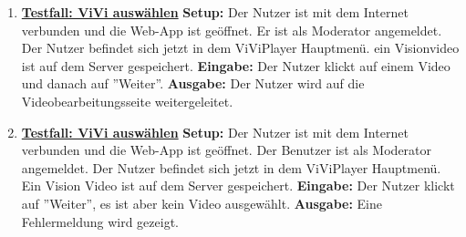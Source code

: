 \begin{enumerate}
	\item \underline{\textbf{Testfall: ViVi auswählen}} \linebreak
	\textbf{Setup:} Der Nutzer ist mit dem Internet verbunden und die Web-App ist geöffnet. Er ist als Moderator angemeldet. Der Nutzer befindet sich jetzt in dem ViViPlayer Hauptmenü. ein Visionvideo ist auf dem Server gespeichert. \linebreak
	\textbf{Eingabe:} Der Nutzer klickt auf einem Video und danach auf ''Weiter''. \linebreak
	\textbf{Ausgabe:} Der Nutzer wird auf die Videobearbeitungsseite weitergeleitet. 
	
	
	
	\item \underline{\textbf{Testfall: ViVi auswählen}} \linebreak
	\textbf{Setup:} Der Nutzer ist mit dem Internet verbunden und die Web-App ist geöffnet. Der Benutzer ist als Moderator angemeldet. Der Nutzer befindet sich jetzt in dem ViViPlayer Hauptmenü. Ein Vision Video ist auf dem Server gespeichert.\linebreak
	\textbf{Eingabe:} Der Nutzer klickt auf ''Weiter'', es ist aber kein Video ausgewählt. \linebreak
	\textbf{Ausgabe:} Eine Fehlermeldung wird gezeigt.
	

\end{enumerate}
